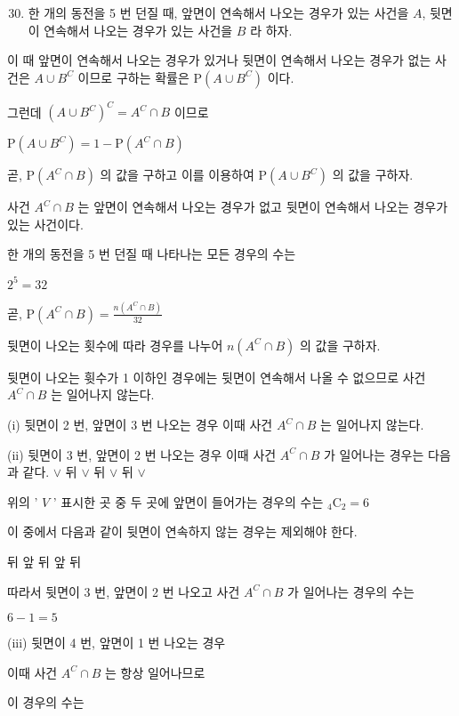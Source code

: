 \documentclass[10pt]{article}
\begin{document}
\begin{enumerate}
  \setcounter{enumi}{29}
  \item 한 개의 동전을 5 번 던질 때, 앞면이 연속해서 나오는 경우가 있는 사건을 $A$, 뒷면이 연속해서 나오는 경우가 있는 사건을 $B$ 라 하자.
\end{enumerate}

이 때 앞면이 연속해서 나오는 경우가 있거나 뒷면이 연속해서 나오는 경우가 없는 사건은 $A \cup B^{C}$ 이므로 구하는 확률은 $\mathrm{P}\left(A \cup B^{C}\right)$ 이다.

그런데 $\left(A \cup B^{C}\right)^{C}=A^{C} \cap B$ 이므로

$\mathrm{P}\left(A \cup B^{C}\right)=1-\mathrm{P}\left(A^{C} \cap B\right)$

곧, $\mathrm{P}\left(A^{C} \cap B\right)$ 의 값을 구하고 이를 이용하여 $\mathrm{P}\left(A \cup B^{C}\right)$ 의 값을 구하자.

사건 $A^{C} \cap B$ 는 앞면이 연속해서 나오는 경우가 없고 뒷면이 연속해서 나오는 경우가 있는 사건이다.

한 개의 동전을 5 번 던질 때 나타나는 모든 경우의 수는

$2^{5}=32$

곧, $\mathrm{P}\left(A^{C} \cap B\right)=\frac{n\left(A^{C} \cap B\right)}{32}$

뒷면이 나오는 횟수에 따라 경우를 나누어 $n\left(A^{C} \cap B\right)$ 의 값을 구하자.

뒷면이 나오는 휫수가 1 이하인 경우에는 뒷면이 연속해서 나올 수 없으므로 사건 $A^{C} \cap B$ 는 일어나지 않는다.

(i) 뒷면이 2 번, 앞면이 3 번 나오는 경우 이때 사건 $A^{C} \cap B$ 는 일어나지 않는다.

(ii) 뒷면이 3 번, 앞면이 2 번 나오는 경우 이때 사건 $A^{C} \cap B$ 가 일어나는 경우는 다음과 같다. $\vee$ 뒤 $\vee$ 뒤 $\vee$ 뒤 $\vee$

위의 ' $V$ ' 표시한 곳 중 두 곳에 앞면이 들어가는 경우의 수는 ${ }_{4} \mathrm{C}_{2}=6$

이 중에서 다음과 같이 뒷면이 연속하지 않는 경우는 제외해야 한다.

뒤 앞 뒤 앞 뒤

따라서 뒷면이 3 번, 앞면이 2 번 나오고 사건 $A^{C} \cap B$ 가 일어나는 경우의 수는

$6-1=5$

(iii) 뒷면이 4 번, 앞면이 1 번 나오는 경우

이때 사건 $A^{C} \cap B$ 는 항상 일어나므로

이 경우의 수는
\end{document}

